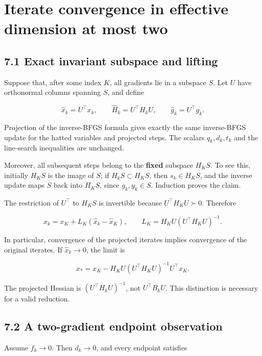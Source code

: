 \section{Iterate convergence in effective dimension at most
two}\label{H:iterate-convergence-in-effective-dimension-at-most-two}

\subsection{7.1 Exact invariant subspace and
lifting}\label{H:exact-invariant-subspace-and-lifting}

Suppose that, after some index \(K\), all gradients lie in a subspace
\(S\). Let \(U\) have orthonormal columns spanning \(S\), and define

\[
\widehat x_k=U^\top x_k,\qquad
\widehat H_k=U^\top H_kU,\qquad
\widehat g_k=U^\top g_k.
\]

Projection of the inverse-BFGS formula gives exactly the same
inverse-BFGS update for the hatted variables and projected steps. The
scalars \(q_k,d_k,t_k\) and the line-search inequalities are unchanged.

Moreover, all subsequent steps belong to the \textbf{fixed} subspace
\(H_KS\). To see this, initially \(H_KS\) is the image of \(S\); if
\(H_kS\subset H_KS\), then \(s_k\in H_KS\), and the inverse update maps
\(S\) back into \(H_KS\), since \(g_k,y_k\in S\). Induction proves the
claim.

The restriction of \(U^\top\) to \(H_KS\) is invertible because
\(U^\top H_KU\succ0\). Therefore

\[
\boxed{
x_k=x_K+L_K(\widehat x_k-\widehat x_K),\qquad
L_K=H_KU(U^\top H_KU)^{-1}.
}
\tag{H.7.1}
\]

In particular, convergence of the projected iterates implies convergence
of the original iterates. If \(\widehat x_k\to0\), the limit is

\[
\boxed{x_*=x_K-H_KU(U^\top H_KU)^{-1}U^\top x_K.}
\tag{H.7.2}
\]

The projected Hessian is \((U^\top H_kU)^{-1}\), not \(U^\top B_kU\).
This distinction is necessary for a valid reduction.

\subsection{7.2 A two-gradient endpoint
observation}\label{H:a-two-gradient-endpoint-observation}

Assume \(f_k\to0\). Then \(d_k\to0\), and every endpoint satisfies

